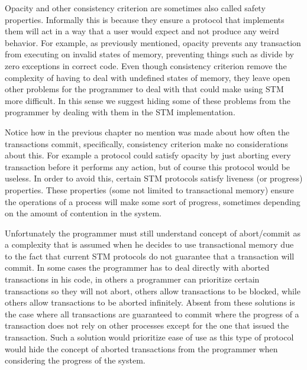 Opacity and other consistency criterion are sometimes also called safety properties.
Informally this is because they ensure a protocol that implements them will
act in a way that a user would expect and not produce any weird behavior.
For example, as previously mentioned, opacity prevents any transaction from executing on invalid states of memory, preventing
things such as divide by zero exceptions in correct code.
Even though consistency criterion remove the complexity of having to deal with undefined states of memory,
they leave open other problems for the programmer to deal with that could make using STM more difficult.
In this sense we suggest hiding some of these problems from the programmer by dealing with them in the STM
implementation.

Notice how in the previous chapter no mention was made about how often the transactions commit,
specifically, consistency criterion make no considerations about this.
For example a protocol could satisfy opacity by just aborting every transaction before it performs
any action, but of course this protocol would be useless.
In order to avoid this, certain STM protocols satisfy liveness (or progress) properties.
These properties (some not limited to transactional memory) ensure the operations of a process
will make some sort of progress, sometimes depending on the amount of contention in the system.





Unfortunately the programmer must still understand
concept of abort/commit as a complexity that is assumed when he decides to use
transactional memory due to the fact that current STM protocols do not
guarantee that a transaction will commit.
In some cases the programmer has to deal directly with aborted transactions
in his code, in others a programmer can prioritize certain transactions
so they will not abort, others allow transactions to be blocked, while
others allow transactions to be aborted infinitely.
Absent from these solutions is the case where all transactions are guaranteed to
commit where the progress of a transaction does not rely on
other processes except for the one that issued the transaction.
Such a solution would prioritize ease of use as this type of protocol would hide
the concept of aborted transactions from the programmer when considering
the progress of the system.

